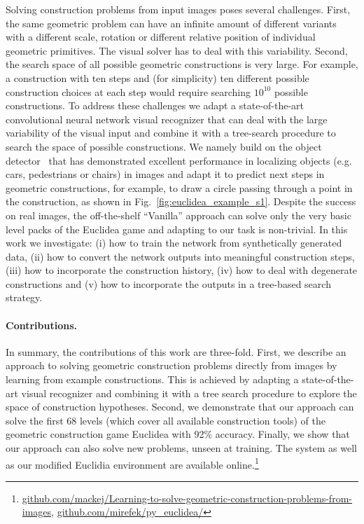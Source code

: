 Solving construction problems from input images poses several challenges. 
First, the same geometric problem can have an infinite amount of different variants with a different scale, rotation or different relative position of individual geometric primitives. The visual solver has to deal with this variability. 
Second, the search space of all possible geometric constructions is very large. For example, a construction with ten steps and (for simplicity) ten different possible construction choices at each step would require searching $10^{10}$ possible constructions. 
To address these challenges we adapt a state-of-the-art convolutional neural network visual recognizer that can deal with the large variability of the visual input and combine it with a tree-search procedure to search the space of possible constructions. We namely build on the \maskrcnn object detector~\cite{maskrcnn} that has demonstrated excellent performance in localizing objects (e.g. cars, pedestrians or chairs) in images and adapt it to predict next steps in geometric constructions, for example, to draw a circle passing through a point in the construction, as shown in Fig.~\ref{fig:euclidea_example_s1}. Despite the success on real images, the off-the-shelf ``Vanilla'' \maskrcnn approach can solve only the very basic level packs of the Euclidea game and adapting \maskrcnn to our task is non-trivial. 
In this work we investigate: (i) how to train the network from synthetically generated data, (ii) how to convert the network outputs into meaningful construction steps,  (iii) how to incorporate the construction history, (iv) how to deal with degenerate constructions and (v) how to incorporate the \maskrcnn outputs in a tree-based search strategy. 

\vspace*{-1mm}
\paragraph{\textbf{Contributions.}}
In summary, the contributions of this work are three-fold.
First, we describe an approach to solving geometric construction problems directly from images by learning from example constructions. This is achieved by adapting a state-of-the-art \maskrcnn visual recognizer and combining it with a tree search procedure to explore the space of construction hypotheses.
Second, we demonstrate that our approach can solve the first 68 levels (which cover all available construction tools) of the geometric construction game Euclidea with 92\% accuracy.
Finally, we show that our approach can also solve new problems, unseen at training. The system as well as our modified Euclidia environment are available online.\footnote{\smaller \url{github.com/mackej/Learning-to-solve-geometric-construction-problems-from-images}, \url{github.com/mirefek/py_euclidea/}} 


